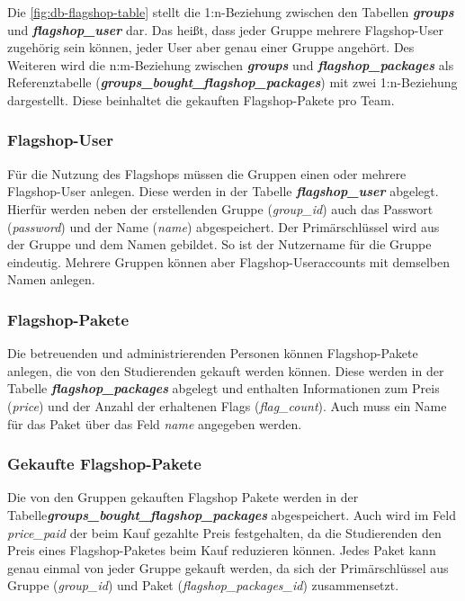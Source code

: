 Die \autoref{fig:db-flagshop-table} stellt die 1:n-Beziehung zwischen den Tabellen \textbf{\textit{groups}} und \textbf{\textit{flagshop\_user}} dar. Das heißt, dass jeder Gruppe mehrere Flagshop-User zugehörig sein können, jeder User aber genau einer Gruppe angehört. Des Weiteren wird die n:m-Beziehung zwischen \textbf{\textit{groups}} und \textbf{\textit{flagshop\_packages}} als Referenztabelle (\textbf{\textit{groups\_bought\_flagshop\_packages}}) mit zwei 1:n-Beziehung dargestellt. Diese beinhaltet die gekauften Flagshop-Pakete pro Team.

\subsubsection{Flagshop-User}
Für die Nutzung des Flagshops müssen die Gruppen einen oder mehrere Flagshop-User anlegen. Diese werden in der Tabelle \textbf{\textit{flagshop\_user}} abgelegt. Hierfür werden neben der erstellenden Gruppe (\textit{group\_id}) auch das Passwort (\textit{password}) und der Name (\textit{name}) abgespeichert. Der Primärschlüssel wird aus der Gruppe und dem Namen gebildet. So ist der Nutzername für die Gruppe eindeutig. Mehrere Gruppen können aber Flagshop-Useraccounts mit demselben Namen anlegen.

\subsubsection{Flagshop-Pakete}
Die betreuenden und administrierenden Personen können Flagshop-Pakete anlegen, die von den Studierenden gekauft werden können. Diese werden in der Tabelle \textbf{\textit{flagshop\_packages}} abgelegt und enthalten Informationen zum Preis (\textit{price}) und der Anzahl der erhaltenen Flags (\textit{flag\_count}). Auch muss ein Name für das Paket über das Feld \textit{name} angegeben werden.

\subsubsection{Gekaufte Flagshop-Pakete}
Die von den Gruppen gekauften Flagshop Pakete werden in der Tabelle\linebreak \textbf{\textit{groups\_bought\_flagshop\_packages}} abgespeichert. Auch wird im Feld \textit{price\_paid} der beim Kauf gezahlte Preis festgehalten, da die Studierenden den Preis eines Flagshop-Paketes beim Kauf reduzieren können. Jedes Paket kann genau einmal von jeder Gruppe gekauft werden, da sich der Primärschlüssel aus Gruppe (\textit{group\_id}) und Paket (\textit{flagshop\_packages\_id}) zusammensetzt.

